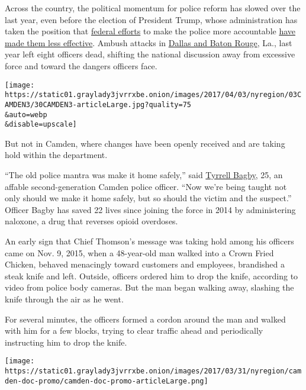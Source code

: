 Across the country, the political momentum for police reform has slowed
over the last year, even before the election of President Trump, whose
administration has taken the position that
\href{https://www.washingtonpost.com/news/the-fix/wp/2016/09/26/the-first-trump-clinton-presidential-debate-transcript-annotated/?utm_term=.7029ff794c26}{federal
efforts} to make the police more accountable
\href{https://www.nytimes3xbfgragh.onion/2017/02/28/us/politics/jeff-sessions-crime.html}{have
made them less effective}. Ambush attacks in
\href{https://www.nytimes3xbfgragh.onion/2016/07/09/us/dallas-attacks-what-we-know-baton-rouge-minnesota.html}{Dallas
and Baton Rouge}, La., last year left eight officers dead, shifting the
national discussion away from excessive force and toward the dangers
officers face.

\texttt{[image: https://static01.graylady3jvrrxbe.onion/images/2017/04/03/nyregion/03CAMDEN3/30CAMDEN3-articleLarge.jpg?quality=75\\\&auto=webp\\\&disable=upscale]}

But not in Camden, where changes have been openly received and are
taking hold within the department.

``The old police mantra was make it home safely,'' said
\href{http://webcache.googleusercontent.com/search?q=cache:O1CKTUJWfRgJ:camdencountypd.org/officer-of-the-week-tyrrell-bagby/+\&cd=1\&hl=en\&ct=clnk\&gl=us}{Tyrrell
Bagby}, 25, an affable second-generation Camden police officer. ``Now
we're being taught not only should we make it home safely, but so should
the victim and the suspect.'' Officer Bagby has saved 22 lives since
joining the force in 2014 by administering naloxone, a drug that
reverses opioid overdoses.

An early sign that Chief Thomson's message was taking hold among his
officers came on Nov. 9, 2015, when a 48-year-old man walked into a
Crown Fried Chicken, behaved menacingly toward customers and employees,
brandished a steak knife and left. Outside, officers ordered him to drop
the knife, according to video from police body cameras. But the man
began walking away, slashing the knife through the air as he went.

For several minutes, the officers formed a cordon around the man and
walked with him for a few blocks, trying to clear traffic ahead and
periodically instructing him to drop the knife.

\href{https://www.nytimes3xbfgragh.onion/interactive/2017/04/02/nyregion/camden-police-policy.html}{}

\texttt{[image: https://static01.graylady3jvrrxbe.onion/images/2017/03/31/nyregion/camden-doc-promo/camden-doc-promo-articleLarge.png]}

